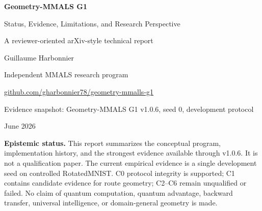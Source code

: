 \documentclass[11pt,a4paper]{article}
\begin{document}
\begin{titlepage}
\centering
\vspace*{1.1cm}
{\Huge\bfseries\color{deepblue} Geometry-MMALS G1\par}
\vspace{0.25cm}
{\LARGE Status, Evidence, Limitations, and Research Perspective\par}
\vspace{0.45cm}
{\large A reviewer-oriented arXiv-style technical report\par}
\vspace{1.1cm}
{\Large Guillaume Harbonnier\par}
\vspace{0.2cm}
{\normalsize Independent MMALS research program\par}
\vspace{0.15cm}
{\normalsize \href{https://github.com/gharbonnier78/geometry-mmalls-g1}{github.com/gharbonnier78/geometry-mmalls-g1}\par}
\vspace{0.7cm}
{\normalsize Evidence snapshot: Geometry-MMALS G1 v1.0.6, seed 0, development protocol\par}
{\normalsize June 2026\par}
\vfill
\begin{minipage}{0.90\textwidth}
\small
\textbf{Epistemic status.} This report summarizes the conceptual program, implementation history, and the strongest evidence available through v1.0.6. It is not a qualification paper. The current empirical evidence is a single development seed on controlled RotatedMNIST. C0 protocol integrity is supported; C1 contains candidate evidence for route geometry; C2--C6 remain unqualified or failed. No claim of quantum computation, quantum advantage, backward transfer, universal intelligence, or domain-general geometry is made.
\end{minipage}
\vfill
\end{titlepage}
\end{document}
